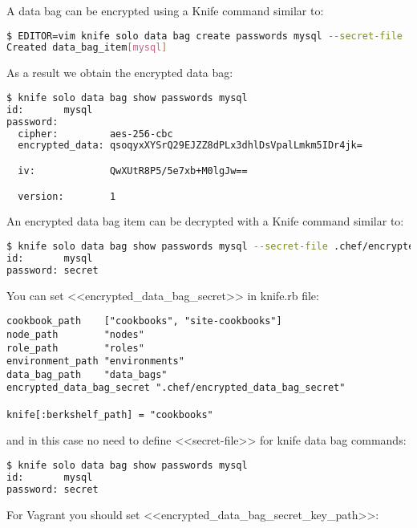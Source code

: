 A data bag can be encrypted using a Knife command similar to:

\begin{lstlisting}[language=Bash,label=lst:my-cloud-chef-databag6,title=my-cloud/Gemfile]
$ EDITOR=vim knife solo data bag create passwords mysql --secret-file .chef/encrypted_data_bag_secret
Created data_bag_item[mysql]
\end{lstlisting}

As a result we obtain the encrypted data bag:

\begin{lstlisting}[language=Bash,label=lst:my-cloud-chef-databag7,title=my-cloud/Gemfile]
$ knife solo data bag show passwords mysql
id:       mysql
password:
  cipher:         aes-256-cbc
  encrypted_data: qsoqyxXYSrQ29EJZZ8dPLx3dhlDsVpalLmkm5IDr4jk=

  iv:             QwXUtR8P5/5e7xb+M0lgJw==

  version:        1
\end{lstlisting}

An encrypted data bag item can be decrypted with a Knife command similar to:

\begin{lstlisting}[language=Bash,label=lst:my-cloud-chef-databag8,title=my-cloud/Gemfile]
$ knife solo data bag show passwords mysql --secret-file .chef/encrypted_data_bag_secret
id:       mysql
password: secret
\end{lstlisting}

You can set <<encrypted\_data\_bag\_secret>> in knife.rb file:

\begin{lstlisting}[label=lst:my-cloud-chef-databag9,title=.chef/knife.rb]
cookbook_path    ["cookbooks", "site-cookbooks"]
node_path        "nodes"
role_path        "roles"
environment_path "environments"
data_bag_path    "data_bags"
encrypted_data_bag_secret ".chef/encrypted_data_bag_secret"

knife[:berkshelf_path] = "cookbooks"
\end{lstlisting}

and in this case no need to define <<secret-file>> for knife data bag commands:

\begin{lstlisting}[language=Bash,label=lst:my-cloud-chef-databag11,title=my-cloud/Gemfile]
$ knife solo data bag show passwords mysql
id:       mysql
password: secret
\end{lstlisting}

For Vagrant you should set <<encrypted\_data\_bag\_secret\_key\_path>>:

